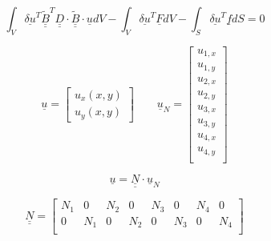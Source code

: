 \documentclass[a4paper]{jpconf}
\begin{document}
\begin{equation}
\int_{V}\underline{\delta u}^{T}\underline{\underline{\widetilde{B}}}^{T}\underline{\underline{D}}\cdot\underline{\underline{\widetilde{B}}}\cdot\underline{u}dV-\int_{V}\underline{\delta u}^{T}\underline{F}dV-\int_{S}\underline{\delta u}^{T}\underline{f}dS=0
\end{equation}


\begin{equation}
\underline{u}=\begin{bmatrix}
u_{x}\left(x,y\right)\\u_{y}\left(x,y\right)
\end{bmatrix}\qquad\underline{u}_{N}=\begin{bmatrix}
u_{1,x}\\u_{1,y}\\u_{2,x}\\u_{2,y}\\u_{3,x}\\u_{3,y}\\u_{4,x}\\u_{4,y}\\
\end{bmatrix}
\end{equation}


\begin{equation}
\underline{u}=\underline{\underline{N}}\cdot\underline{u}_{N}
\end{equation}

\begin{equation}
\underline{\underline{N}}=\begin{bmatrix}
N_{1}&0&N_{2}&0&N_{3}&0&N_{4}&0\\
0&N_{1}&0&N_{2}&0&N_{3}&0&N_{4}\\
\end{bmatrix}
\end{equation}
\end{document}
